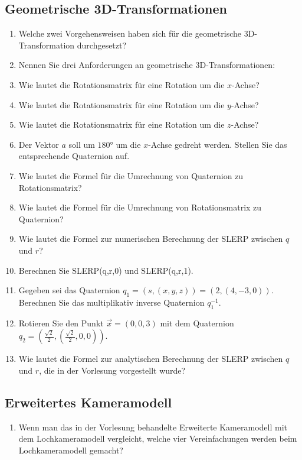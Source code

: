 \subsection{Geometrische 3D-Transformationen}
\begin{enumerate}
\item Welche zwei Vorgehensweisen haben sich für die geometrische 3D-Transformation durchgesetzt?
\item Nennen Sie drei Anforderungen an geometrische 3D-Transformationen:
\item Wie lautet die Rotationsmatrix für eine Rotation um die $x$-Achse? %
\item Wie lautet die Rotationsmatrix für eine Rotation um die $y$-Achse? %
\item Wie lautet die Rotationsmatrix für eine Rotation um die $z$-Achse?
\item Der Vektor $a$ soll um $180°$ um die $x$-Achse gedreht werden. Stellen Sie das entsprechende Quaternion auf. 
\item Wie lautet die Formel für die Umrechnung von Quaternion zu Rotationsmatrix?
\item Wie lautet die Formel für die Umrechnung von Rotationsmatrix zu Quaternion?
\item Wie lautet die Formel zur numerischen Berechnung der SLERP zwischen $q$ und $r$?
\item Berechnen Sie SLERP(q,r,0) und SLERP(q,r,1).
	\item Gegeben sei das Quaternion $q_1=(s,(x,y,z))=(2,(4,-3,0))$. Berechnen Sie das multiplikativ inverse Quaternion $q^{-1}_{1}$. %
	\item Rotieren Sie den Punkt $\vec{x}=(0,0,3)$ mit dem Quaternion $q_2=(\frac{\sqrt{2}}{2},(\frac{\sqrt{2}}{2},0,0))$. %
	\item Wie lautet die Formel zur analytischen Berechnung der SLERP zwischen $q$ und $r$, die in der Vorlesung vorgestellt wurde? %
\end{enumerate}


\subsection{Erweitertes Kameramodell}
\begin{enumerate}
	\item Wenn man das in der Vorlesung behandelte Erweiterte Kameramodell mit dem Lochkameramodell vergleicht, welche vier Vereinfachungen werden beim Lochkameramodell gemacht?
\end{enumerate}


